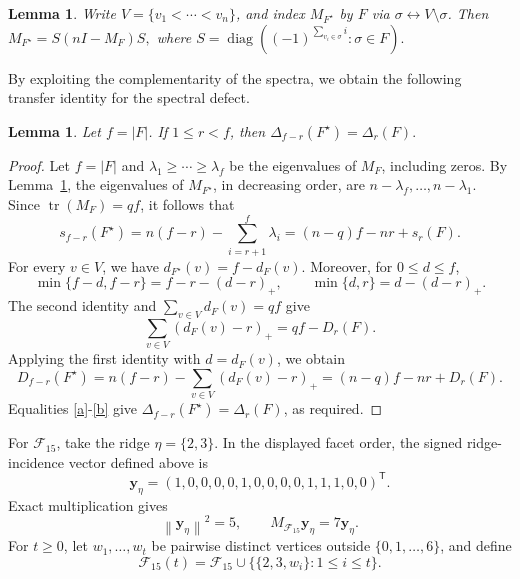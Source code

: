 \documentclass[11pt]{article}
\newtheorem{lemma}[theorem]{Lemma}
\newcommand{\tr}{\operatorname{tr}}
\newcommand{\norm}[1]{\left\lVert #1\right\rVert}
\newcommand{\diag}{\operatorname{diag}}
\newcommand{\calF}{\mathcal{F}}
\begin{document}
	\begin{lemma}\label{lem:hodge-star}
		Write \(V=\{v_1<\cdots<v_n\}\), and index \(M_{F^\star}\) by \(F\)
		via \(\sigma\leftrightarrow V\setminus\sigma\).  Then
		$M_{F^\star}=S(nI-M_F)S,$ where $
		S=\diag\left((-1)^{\sum_{v_i\in\sigma}i}:\sigma\in F\right).$
	\end{lemma}
	
By exploiting the complementarity of the spectra,
we obtain the following transfer identity for the spectral defect.
\begin{lemma}\label{lem:defect-transfer}
Let \(f=|F|\). If \(1\le r<f\), then
$
\Delta_{f-r}(F^\star)=\Delta_r(F).
$
\end{lemma}

\begin{proof}
Let \(f=|F|\) and \(\lambda_1\geq\cdots\geq\lambda_f\) be the eigenvalues of \(M_F\),
including zeros. By Lemma~\ref{lem:hodge-star}, the eigenvalues of
\(M_{F^\star}\), in decreasing order, are
\(n-\lambda_f,\ldots,n-\lambda_1\). Since
\(\tr(M_F)=qf\), it follows that
\begin{equation}\label{a}
s_{f-r}(F^\star)
=n(f-r)-\sum_{i=r+1}^f\lambda_i
=(n-q)f-nr+s_r(F).
\end{equation}
For every \(v\in V\), we have
\(d_{F^\star}(v)=f-d_F(v)\). Moreover, for \(0\leq d\leq f\),
\[
\min\{f-d,f-r\}=f-r-(d-r)_+,
\qquad
\min\{d,r\}=d-(d-r)_+.
\]
The second identity and \(\sum_{v\in V}d_F(v)=qf\) give
\[
\sum_{v\in V}(d_F(v)-r)_+=qf-D_r(F).
\]
Applying the first identity with \(d=d_F(v)\), we obtain
\begin{equation}\label{b}
D_{f-r}(F^\star)
=n(f-r)-\sum_{v\in V}(d_F(v)-r)_+
=(n-q)f-nr+D_r(F).
\end{equation}
Equalities \eqref{a}-\eqref{b} give
\(\Delta_{f-r}(F^\star)=\Delta_r(F)\), as required.
\end{proof}
	For \(\calF_{15}\), take the ridge \(\eta=\{2,3\}\).  In the displayed
	facet order, the signed ridge-incidence vector defined above is
	\[
	\mathbf y_\eta=(1,0,0,0,0,1,0,0,0,0,1,1,1,0,0)^{\mathsf T}.
	\]
	Exact multiplication gives
	\begin{equation}\label{eq:F15-ridge-vector}
		\norm{\mathbf y_\eta}^2=5,
		\qquad
		M_{\calF_{15}}\mathbf y_\eta=7\mathbf y_\eta.
	\end{equation}
	For \(t\geq0\), let \(w_1,\ldots,w_t\) be pairwise distinct vertices
outside \(\{0,1,\ldots,6\}\), and define
\[
\calF_{15}(t)
=
\calF_{15}\cup\{\{2,3,w_i\}:1\leq i\leq t\}.
\]
	
\end{document}
